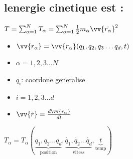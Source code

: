 \documentclass[12pt]{book}
\begin{document}
            \subsection{lenergie cinetique est :}
                $T = \sum^N_{\alpha=1}T_\alpha =\sum^N_{\alpha=1}\frac{1}{2}m_\alpha\vv{\dot{r_\alpha}}^2 $ 
                \begin{itemize}
                    \item $\vv{r_\alpha} = \vv{r_\alpha}(q_1,q_2,q_3\ldots q_d ,t) $
                    \item $\alpha = 1,2,3 \ldots N$
                    \item $q_i$: coordone generalise 
                    \item $i=1,2,3\ldots d$
                    \item $\vv{\dot{r}} = \frac{d\vv{r_\alpha} }{dt}$
                \end{itemize}
                $T_\alpha = T_\alpha(\underbrace{q_1,q_2\ldots q_d}_{\text{position}} , \underbrace{\dot{q_1},\dot{q_2}\ldots\dot{q_d}}_{\text{vitess}} , \underbrace{t}_{\text{temp}}) $ \\
\end{document}
